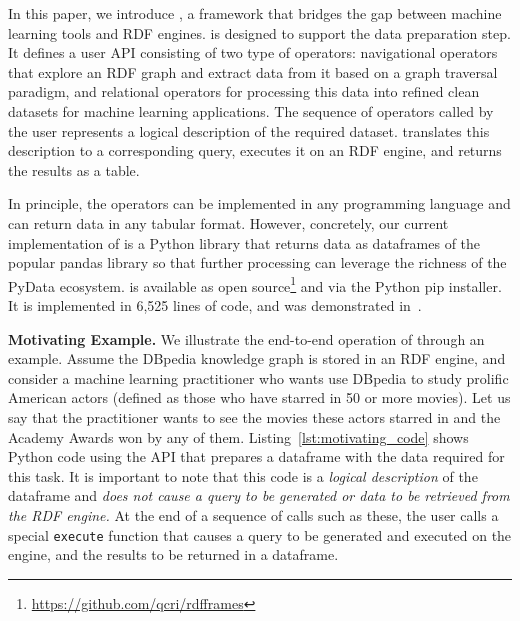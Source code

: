 In this paper, we introduce \textit{\rdfframes},
a framework that bridges the gap between machine learning tools and RDF engines.
\rdfframes is designed to support the data preparation step.
It defines a user API consisting of two type of operators: navigational operators that explore an RDF graph and extract data from it based on a graph traversal paradigm, and relational operators for processing this data into refined clean datasets for machine learning applications.
The sequence of operators called by the user represents a logical description of the required dataset.
\rdfframes translates this description to a corresponding \sparql query, executes it 
on an RDF engine,
and returns the results as a table.

In principle, the \rdfframes operators can be implemented in any programming language and can return data in any tabular format.
However, concretely, our current implementation of \rdfframes is a Python library that returns data as dataframes of the popular pandas 
library
so that further processing can leverage
the richness
of the PyData ecosystem.
\rdfframes is available as open source\footnote{\url{https://github.com/qcri/rdfframes}}
and via the Python 
pip installer. It is implemented in 6,525 lines of code, and was demonstrated in~\cite{rdfframes-demo}.

\vspace{4pt}
\noindent
\textbf{Motivating Example.}
We illustrate the end-to-end operation of \rdfframes through an example.
Assume the DBpedia knowledge graph is stored in an RDF engine,
and consider a machine learning practitioner who wants 
use DBpedia
to study
prolific American actors (defined as those who have starred in 50 or more movies).
Let us say that the practitioner wants to see
the movies these actors starred in
and the Academy Awards won by any of them.
Listing~\ref{lst:motivating_code} shows Python code using the \rdfframes API that prepares a dataframe with the
data required for this task.
It is important to note that this code is a \textit{logical description} of the dataframe and \textit{does not cause a query to be generated or data to be retrieved from the RDF engine.}
At the end of a sequence of calls such as these, the user calls a special \texttt{execute}
function that causes a \sparql query to be generated and executed on the engine, and the results to be returned in a dataframe.

